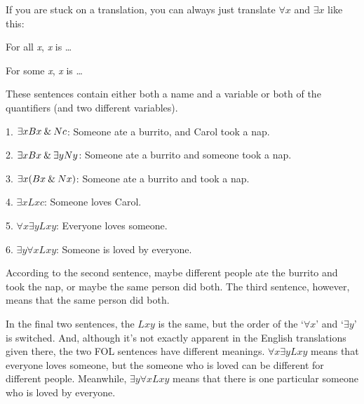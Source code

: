 If you are stuck on a translation, you can always just translate $\forall x$ and $\exists x$ like this:
\begin{ebullet}
\item[] For all \textit{x}, \textit{x} is \ldots
\item[] For some \textit{x}, \textit{x} is \ldots
\end{ebullet}



These sentences contain either both a name and a variable or both of the quantifiers (and two different variables).
\begin{ebullet}
	\item[1.]$\exists xBx \mathbin{\&} Nc$: Someone ate a burrito, and Carol took a nap.\smallskip
	\item[2.]$\exists xBx \mathbin{\&} \exists yNy$: Someone ate a burrito and someone took a nap.\smallskip
	\item[3.]$\exists x(Bx \mathbin{\&} Nx)$: Someone ate a burrito and took a nap.\smallskip
	\item[4.]$\exists xLxc$: Someone loves Carol.\smallskip
	\item[5.]$\forall x \exists yLxy$: Everyone loves someone.\smallskip
	\item[6.]$\exists y \forall xLxy$: Someone is loved by everyone.
\end{ebullet}
According to the second sentence, maybe different people ate the burrito and took the nap, or maybe the same person did both. The third sentence, however, means that the same person did both.

\label{quantifier-order} In the final two sentences, the $Lxy$ is the same, but the order of the `$\forall x$' and `$\exists y$' is switched. And, although it's not exactly apparent in the English translations given there, the two FOL sentences have different meanings. $\forall x \exists yLxy$ means that everyone loves someone, but the someone who is loved can be different for different people. Meanwhile, $\exists y \forall xLxy$ means that there is one particular someone who is loved by everyone.

